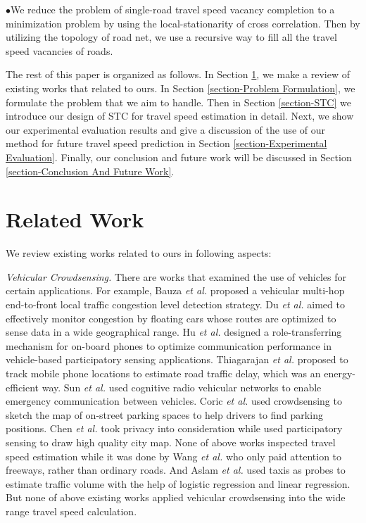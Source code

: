 \documentclass[twocolumn,10pt,final,conference]{IEEEtran}
\def\etal{\textit{et al.}\xspace}
\begin{document}
$\bullet$We reduce the problem of single-road travel speed vacancy completion to a minimization problem by using the local-stationarity of cross correlation. Then by utilizing the topology of road net, we use a recursive way to fill all the travel speed vacancies of roads.

The rest of this paper is organized as follows. In Section \ref{section-Related Works}, we make a review of existing works that related to ours. In Section \ref{section-Problem Formulation}, we formulate the problem that we aim to handle.
Then in Section \ref{section-STC} we introduce our design of STC for travel speed estimation in detail.
Next, we show our experimental evaluation results and give a discussion of the use of our method for future travel speed prediction in Section \ref{section-Experimental Evaluation}. Finally, our conclusion and future work will be discussed in Section \ref{section-Conclusion And Future Work}.
\section{Related Work}\label{section-Related Works}
We review  existing works related to ours in following aspects:

\emph{Vehicular Crowdsensing.}
There are works that examined the use of vehicles for certain applications. For example, Bauza \etal \cite{Ref13} proposed a vehicular multi-hop end-to-front local traffic congestion level detection strategy. Du \etal \cite{Ref16} aimed to effectively monitor congestion by floating cars whose routes are optimized to sense data in a wide geographical range. Hu \etal \cite{Ref101} designed a role-transferring mechanism for on-board phones to optimize communication performance in vehicle-based participatory sensing applications. Thiagarajan \etal \cite{VTrack} proposed to track mobile phone locations to estimate road traffic delay, which was an energy-efficient way. Sun \etal \cite{EnablingEmergency} used cognitive radio vehicular networks to enable emergency communication between vehicles. Coric \etal \cite{Ref42} used crowdsensing to sketch the map of on-street parking spaces to help drivers to find parking positions. Chen \etal \cite{Ref76} took privacy into consideration while used participatory sensing to draw high quality city map. None of above works inspected travel speed estimation while it was done by Wang \etal \cite{Ref80} who only paid attention to freeways, rather than ordinary roads. And Aslam \etal \cite{Ref79} used taxis as probes to estimate traffic volume with the help of logistic regression and linear regression. But none of above existing works applied vehicular crowdsensing into the wide range travel speed calculation.
\end{document}
